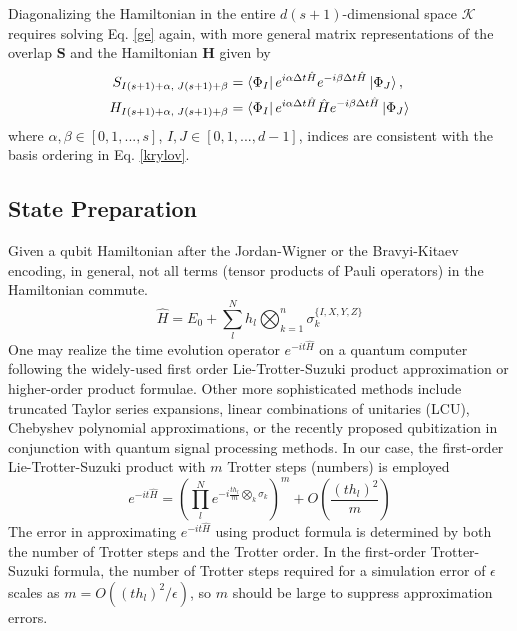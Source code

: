 \documentclass[journal=jctcce,manuscript=article]{achemso}
\begin{document}
Diagonalizing the Hamiltonian in the entire $d(s+1)$-dimensional space $\mathcal{K}$ requires solving Eq. \ref{ge} again, with more general matrix representations of the overlap $\mathbf{S}$ and the Hamiltonian $\mathbf{H}$ given by
\begin{align}
\label{overlap_eq}
S_{I(s+1)+\alpha,\; J(s+1)+\beta} &= \left\langle{\Phi_I}\right\vert e^{i \alpha \Delta t \hat{H}} e^{-i \beta \Delta t \hat{H}} \left\vert{\Phi_J}\right\rangle, \\
\label{hamiltonian_eq}
H_{I(s+1)+\alpha,\; J(s+1)+\beta} &= \left\langle{\Phi_I}\right\vert e^{i \alpha \Delta t \hat{H}} \hat{H} e^{-i \beta \Delta t \hat{H}} \left\vert{\Phi_J}\right\rangle
\end{align}
where $\alpha, \beta \in [0,1,...,s]$, $I, J \in [0,1,...,d-1]$, indices are consistent with the basis ordering in Eq. \ref{krylov}. 

\subsection{State Preparation} 

Given a qubit Hamiltonian after the Jordan-Wigner\cite{jordan1993paulische} or the Bravyi-Kitaev encoding,\cite{Seeley:2012em} in general, not all terms (tensor products of Pauli operators) in the Hamiltonian commute.
\begin{equation}
\hat{H}=E_{0}+\sum_{l}^{N} h_{l} \bigotimes_{k=1}^{n} \sigma_{k}^{\{I, X, Y, Z\}}
\end{equation}
One may realize the time evolution operator $e^{-i t \hat{H}}$ on a quantum computer following the widely-used first order Lie-Trotter-Suzuki product approximation\cite{Trotter:1959wh, Suzuki:1991fz, hatano2005finding} or higher-order product formulae\cite{Suzuki:1976cf, Berry:2007iw}. 
Other more sophisticated methods include truncated Taylor series expansions,\cite{Berry:2015ir, Babbush:2016bx}
linear combinations of unitaries (LCU),\cite{Childs:2012cg}
Chebyshev polynomial approximations,\cite{Subramanian:2019ex} 
or the recently proposed qubitization\cite{Low:2019kr, Berry:2019bb} in conjunction with quantum signal processing\cite{Low:2017kn} methods.
In our case, the first-order Lie-Trotter-Suzuki product with $m$ Trotter steps (numbers) is employed
\begin{equation}
e^{-i t \hat{H}}=\left(\prod_{l}^N e^{-i \frac{t h_{l}}{m} \bigotimes_{k} \sigma_{k}}\right)^{m} 
+ O\left(\frac{(t h_{l})^{2}} {m}\right)
\end{equation}
The error in approximating $e^{-i t \hat{H}}$ using product formula is determined by both the number of Trotter steps and the Trotter order. 
In the first-order Trotter-Suzuki formula, the number of Trotter steps required for a simulation error of $\epsilon$ scales as $m = O((t h_{l})^{2} / \epsilon)$, so $m$ should be large to suppress approximation errors. 
\end{document}
